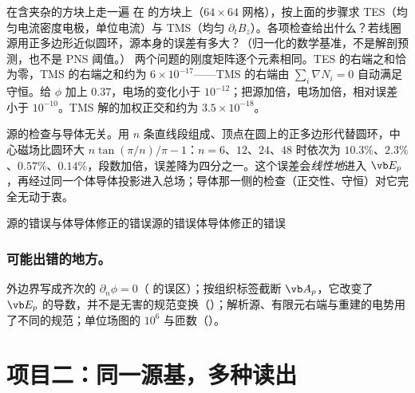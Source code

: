 \begin{example}[label=ex:projects-p1]{在含夹杂的方块上走一遍}
在 的方块上（$64\times64$ 网格），按上面的步骤求 TES（均匀电流密度电极，单位电流）与 TMS（均匀 $\partial_tB_z$）。各项检查给出什么？若线圈源用正多边形近似圆环，源本身的误差有多大？（归一化的数学基准，不是解剖预测，也不是 PNS 阈值。）
\solution
两个问题的刚度矩阵逐个元素相同。TES 的右端之和恰为零，TMS 的右端之和约为 $6\times10^{-17}$——TMS 的右端由 $\sum_i\nabla N_i=0$ 自动满足守恒。给 $\phi$ 加上 $0.37$，电场的变化小于 $10^{-12}$；把源加倍，电场加倍，相对误差小于 $10^{-10}$。TMS 解的加权正交和约为 $3.5\times10^{-18}$。

源的检查与导体无关。用 $n$ 条直线段组成、顶点在圆上的正多边形代替圆环，中心磁场比圆环大 $n\tan(\pi/n)/\pi-1$：$n=6$、$12$、$24$、$48$ 时依次为 $10.3\%$、$2.3\%$、$0.57\%$、$0.14\%$，段数加倍，误差降为四分之一。这个误差会\emph{线性地}进入 $\vb E_p$，再经过同一个体导体投影进入总场；导体那一侧的检查（正交性、守恒）对它完全无动于衷。
\end{example}

\begin{compare}{源的错误与体导体修正的错误}{源的错误}{体导体修正的错误}
\end{compare}

\subsubsection{可能出错的地方。}
外边界写成齐次的 $\partial_n\phi=0$（ 的误区）；按组织标签截断 $\vb A_p$，它改变了 $\vb E_p$ 的导数，并不是无害的规范变换（）；解析源、有限元右端与重建的电势用了不同的规范；单位场图的 $10^6$ 与匝数（）。

\section{项目二：同一源基，多种读出}\label{sec:projects-p2}

